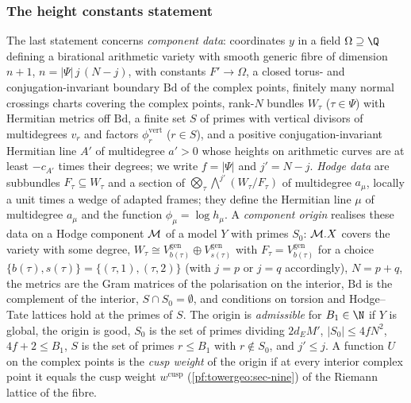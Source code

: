 \subsubsection*{The height constants statement}
The last statement concerns \emph{component data}: coordinates $y$ in a field $\Omega\supseteq\Q$
defining a birational arithmetic variety with smooth generic fibre of dimension $n+1$,
$n=|\Psi|\,j\,(N-j)$, with constants $F'\to\Omega$, a closed torus- and conjugation-invariant boundary
$\mathrm{Bd}$ of the complex points, finitely many normal crossings charts covering the complex points,
rank-$N$ bundles $W_\tau$ ($\tau\in\Psi$) with Hermitian metrics off $\mathrm{Bd}$, a finite set $S$ of
primes with vertical divisors of multidegrees $v_r$ and factors $\phi^{\mathrm{vert}}_r$ ($r\in S$), and a
positive conjugation-invariant Hermitian line $A'$ of multidegree $a'>0$ whose heights on arithmetic
curves are at least $-c_{A'}$ times their degrees; we write $f=|\Psi|$ and $j'=N-j$. \emph{Hodge data} are
subbundles $F_\tau\subseteq W_\tau$ and a section of $\bigotimes_\tau\bigwedge^{j'}(W_\tau/F_\tau)$ of
multidegree $a_\mu$, locally a unit times a wedge of adapted frames; they define the Hermitian line $\mu$ of
multidegree $a_\mu$ and the function $\phi_\mu=\log h_\mu$. A \emph{component origin} realises these
data on a Hodge component $\mathcal M$ of a model $Y$ with primes $S_0$: $\mathcal M.X$ covers the
variety with some degree, $W_\tau\cong V^{\mathrm{gen}}_{b(\tau)}\oplus V^{\mathrm{gen}}_{s(\tau)}$ with
$F_\tau=V^{\mathrm{gen}}_{b(\tau)}$ for a choice $\{b(\tau),s(\tau)\}=\{(\tau,1),(\tau,2)\}$ (with $j=p$ or
$j=q$ accordingly), $N=p+q$, the metrics are the Gram matrices of the polarisation on the interior,
$\mathrm{Bd}$ is the complement of the interior, $S\cap S_0=\emptyset$, and conditions on torsion and
Hodge--Tate lattices hold at the primes of $S$. The origin is \emph{admissible} for $B_1\in\N$ if $Y$ is
global, the origin is good, $S_0$ is the set of primes dividing $2d_EM'$, $|S_0|\le4fN^2$,
$4f+2\le B_1$, $S$ is the set of primes $r\le B_1$ with $r\notin S_0$, and $j'\le j$. A function $U$ on the
complex points is the \emph{cusp weight} of the origin if at every interior complex point it equals the
cusp weight $w^{\mathrm{cusp}}$ (\cref{pf:towergeo:sec-nine}) of the Riemann lattice of the fibre.

